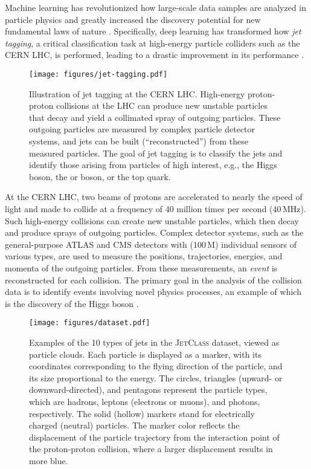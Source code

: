 \documentclass[nohyperref]{article}
\theoremstyle{plain}
\theoremstyle{definition}
\theoremstyle{remark}
\newcommand{\jetclass}{{\textsc{JetClass}}\xspace}
\begin{document}
Machine learning has revolutionized how large-scale data samples are analyzed in particle physics and greatly increased the discovery potential for new fundamental laws of nature \cite{Radovic:2018dip}. Specifically, deep learning has transformed how \textit{jet tagging}, a critical classification task at high-energy particle colliders such as the CERN LHC, is performed, leading to a drastic improvement in its performance \cite{Kogler:2018hem,Larkoski:2017jix}.

\begin{figure}[tb]
\begin{center}
\centerline{\texttt{[image: figures/jet-tagging.pdf]}}
\caption{Illustration of jet tagging at the CERN LHC. High-energy proton-proton collisions at the LHC can produce new unstable particles that decay and yield a collimated spray of outgoing particles. These outgoing particles are measured by complex particle detector systems, and jets can be built (``reconstructed'') from these measured particles. The goal of jet tagging is to classify the jets and identify those arising from particles of high interest, e.g., the Higgs boson, the  or  boson, or the top quark.}
\label{fig:jet-tagging}
\end{center}
\vskip -0.4in
\end{figure}

At the CERN LHC, two beams of protons are accelerated to nearly the speed of light and made to collide at a frequency of 40 million times per second (40\,MHz). Such high-energy collisions can create new unstable particles, which then decay and produce sprays of outgoing particles. Complex detector systems, such as the general-purpose ATLAS \cite{ATLAS:2008xda} and CMS \cite{CMS:2008xjf} detectors with (100\,M) individual sensors of various types, are used to measure the positions, trajectories, energies, and momenta of the outgoing particles. From these measurements, an \textit{event} is reconstructed for each collision. The primary goal in the analysis of the collision data is to identify events involving novel physics processes, an example of which is the discovery of the Higgs boson \cite{ATLAS:2012yve,CMS:2012qbp}. 


\begin{figure*}[t]
\begin{center}
\centerline{\texttt{[image: figures/dataset.pdf]}}
\vskip -0.2in
\caption{Examples of the 10 types of jets in the \jetclass dataset, viewed as particle clouds. Each particle is displayed as a marker, with its coordinates corresponding to the flying direction of the particle, and its size proportional to the energy. The circles, triangles (upward- or downward-directed), and pentagons represent the particle types, which are hadrons, leptons (electrons or muons), and photons, respectively. The solid (hollow) markers stand for electrically charged (neutral) particles. The marker color reflects the displacement of the particle trajectory from the interaction point of the proton-proton collision, where a larger displacement results in more blue.}
\label{fig:dataset}
\end{center}
\vskip -0.4in
\end{figure*}
\end{document}
